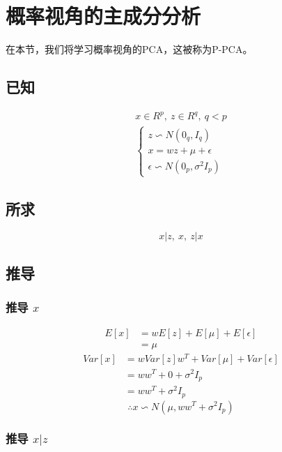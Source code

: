 \documentclass{report}
\begin{document}
\section{概率视角的主成分分析}
在本节，我们将学习概率视角的PCA，这被称为P-PCA。
\subsection{已知}
$$
\begin{aligned}
x \in R^p, \ z \in R^q, \ q < p\\
\begin{cases}
z \backsim N(0_q, I_q)\\
x = wz + \mu + \epsilon\\
\epsilon \backsim N(0_p, \sigma^2 I_p)
\end{cases}
\end{aligned}
$$
\subsection{所求}
$$
x|z, \ x, \ z|x
$$
\subsection{推导}
\subsubsection{推导 $x$}
\begin{equation}
\begin{aligned}
E[x]
&= w E[z] + E[\mu] + E[\epsilon]\\
&=\mu
\end{aligned}
\end{equation}
\begin{equation}
\begin{aligned}
Var[x] &= w Var[z] w^T + Var[\mu] + Var[\epsilon]\\
&=ww^T + 0 + \sigma^2 I_p\\
&=ww^T + \sigma^2 I_p
\end{aligned}
\end{equation}
$$
\therefore x \backsim N(\mu, ww^T + \sigma^2 I_p)
$$
\subsubsection{推导 $x|z$}
\end{document}
